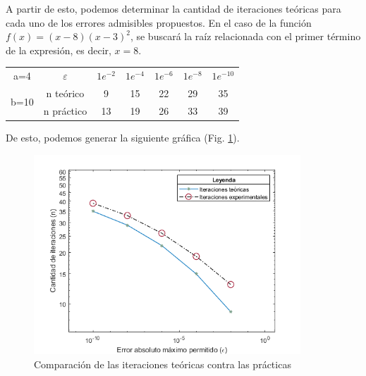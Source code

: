 \documentclass[english,notitlepage,letterpaper, 10pt]{article} %
\begin{document}
\begin{enumerate}
\begin{enumerate}
      A partir de esto, podemos determinar la cantidad de iteraciones teóricas para cada uno de los errores admisibles propuestos. En el caso de la función $f(x)=(x-8)(x-3)^2$, se buscará la raíz relacionada con el primer término de la expresión, es decir, $x=8$. 
      
      \begin{table}[H]
        \centering
        \begin{tabular}{|c|c|c|c|c|c|c|}
        \hline
        \multirow{3}{*}{a=4}  & \multirow{2}{*}{$\varepsilon$} & \multirow{2}{*}{$1e^{-2}$} & \multirow{2}{*}{$1e^{-4}$} & \multirow{2}{*}{$1e^{-6}$} & \multirow{2}{*}{$1e^{-8}$} & \multirow{2}{*}{$1e^{-10}$} \\ &  &  &  &  &  &   \\
        \cline{2-7}  & \multirow{2}{*}{n teórico} & \multirow{2}{*}{9} & \multirow{2}{*}{15}& \multirow{2}{*}{22}& \multirow{2}{*}{29}& \multirow{2}{*}{35} \\ \cline{1-1} \multirow{3}{*}{b=10} &  &  &  &  &  &   \\
        \cline{2-7} & \multirow{2}{*}{n práctico} & \multirow{2}{*}{13}  & \multirow{2}{*}{19}  & \multirow{2}{*}{26}  & \multirow{2}{*}{33}  & \multirow{2}{*}{39}\\ &  &  &  &  &  &  \\ \hline
        \end{tabular}
      \end{table}

      De esto, podemos generar la siguiente gráfica (Fig. \ref{leGraph}).

      \begin{figure}[H]
        \centering
        \includegraphics[width=10cm]{Images/leGraph.png}
        \caption{Comparación de las iteraciones teóricas contra las prácticas}
        \label{leGraph}
      \end{figure}


\end{enumerate}
\end{enumerate}
\end{document}

